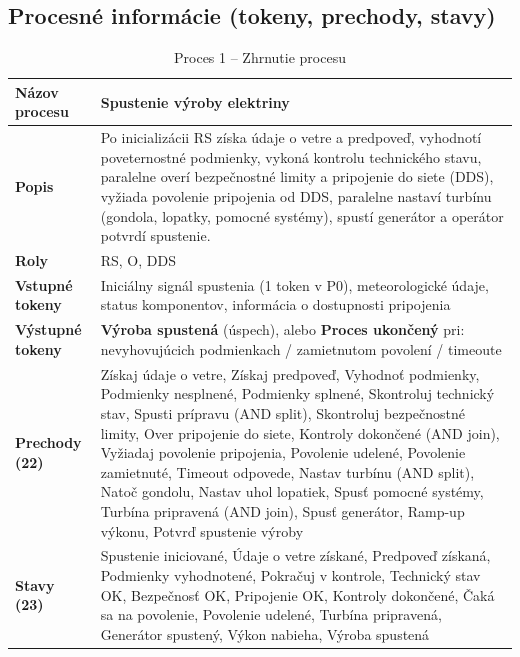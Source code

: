 \documentclass[12pt,a4paper]{article}
\begin{document}
\subsection{Procesné informácie (tokeny, prechody, stavy)}
\begin{table}[H]
  \centering
  \renewcommand{\arraystretch}{1.2}
  \begin{tabularx}{\textwidth}{|p{}|X|}
    \hline
    \textbf{Názov procesu} & Spustenie výroby elektriny \\
    \hline
    \textbf{Popis} & Po inicializácii RS získa údaje o vetre a predpoveď, vyhodnotí poveternostné podmienky, vykoná kontrolu technického stavu, paralelne overí bezpečnostné limity a pripojenie do siete (DDS), vyžiada povolenie pripojenia od DDS, paralelne nastaví turbínu (gondola, lopatky, pomocné systémy), spustí generátor a operátor potvrdí spustenie. \\
    \hline
    \textbf{Roly} & RS, O, DDS \\
    \hline
    \textbf{Vstupné tokeny} & Iniciálny signál spustenia (1 token v P0), meteorologické údaje, status komponentov, informácia o dostupnosti pripojenia \\
    \hline
    \textbf{Výstupné tokeny} & \textbf{Výroba spustená} (úspech), alebo \textbf{Proces ukončený} pri: nevyhovujúcich podmienkach / zamietnutom povolení / timeoute \\
    \hline
    \textbf{Prechody (22)} & Získaj údaje o vetre, Získaj predpoveď, Vyhodnoť podmienky, Podmienky nesplnené, Podmienky splnené, Skontroluj technický stav, Spusti prípravu (AND split), Skontroluj bezpečnostné limity, Over pripojenie do siete, Kontroly dokončené (AND join), Vyžiadaj povolenie pripojenia, Povolenie udelené, Povolenie zamietnuté, Timeout odpovede, Nastav turbínu (AND split), Natoč gondolu, Nastav uhol lopatiek, Spusť pomocné systémy, Turbína pripravená (AND join), Spusť generátor, Ramp-up výkonu, Potvrď spustenie výroby \\
    \hline
    \textbf{Stavy (23)} & Spustenie iniciované, Údaje o vetre získané, Predpoveď získaná, Podmienky vyhodnotené, Pokračuj v kontrole, Technický stav OK, Bezpečnosť OK, Pripojenie OK, Kontroly dokončené, Čaká sa na povolenie, Povolenie udelené, Turbína pripravená, Generátor spustený, Výkon nabieha, Výroba spustená \\
    \hline
  \end{tabularx}
  \caption{Proces 1 -- Zhrnutie procesu}
\end{table}
\end{document}
